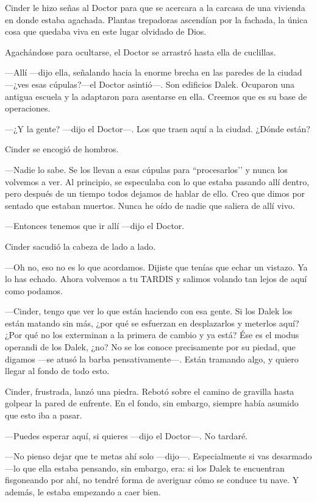 Cinder le hizo señas al Doctor para que se acercara a la carcasa de una vivienda en donde estaba agachada. Plantas trepadoras ascendían por la fachada, la única cosa que quedaba viva en este lugar olvidado de Dios.

Agachándose para ocultarse, el Doctor se arrastró hasta ella de cuclillas.



—Allí —dijo ella, señalando hacia la enorme brecha en las paredes de la ciudad —¿ves esas cúpulas?—el Doctor asintió—. Son edificios Dalek. Ocuparon una antigua escuela y la adaptaron para asentarse en ella. Creemos que es su base de operaciones.

—¿Y la gente? —dijo el Doctor—. Los que traen aquí a la ciudad. ¿Dónde están?

Cinder se encogió de hombros.

—Nadie lo sabe. Se los llevan a esas cúpulas para “procesarlos’’ y nunca los volvemos a ver. Al principio, se especulaba con lo que estaba pasando allí dentro, pero después de un tiempo todos dejamos de hablar de ello. Creo que dimos por sentado que estaban muertos. Nunca he oído de nadie que saliera de allí vivo.

—Entonces tenemos que ir allí —dijo el Doctor.

Cinder sacudió la cabeza de lado a lado.

—Oh no, eso no es lo que acordamos. Dijiste que tenías que echar un vistazo. Ya lo has echado. Ahora volvemos a tu TARDIS y salimos volando tan lejos de aquí como podamos.

—Cinder, tengo que ver lo que están haciendo con esa gente. Si los Dalek los están matando sin más, ¿por qué se esfuerzan en desplazarlos y meterlos aquí? ¿Por qué no los exterminan a la primera de cambio y ya está? Ése es el modus operandi de los Dalek, ¿no? No se los conoce precisamente por su piedad, que digamos —se atusó la barba pensativamente—. Están tramando algo, y quiero llegar al fondo de todo esto.

Cinder, frustrada, lanzó una piedra. Rebotó sobre el camino de gravilla hasta golpear la pared de enfrente. En el fondo, sin embargo, siempre había asumido que esto iba a pasar.

—Puedes esperar aquí, si quieres —dijo el Doctor—. No tardaré.

—No pienso dejar que te metas ahí solo —dijo—. Especialmente si vas desarmado —lo que ella estaba pensando, sin embargo, era: si los Dalek te encuentran fisgoneando por ahí, no tendré forma de averiguar cómo se conduce tu nave. Y además, le estaba empezando a caer bien.

